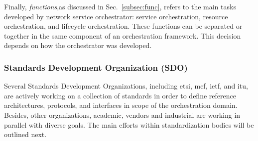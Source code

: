 Finally,  \textit{functions},as discussed in Sec.~\ref{subsec:func}, refers to the main tasks developed by network service orchestrator: service orchestration, resource orchestration, and lifecycle orchestration. These functions can be separated or together in the same component of an orchestration framework. This decision depends on how the orchestrator was developed.

\subsubsection{Standards Development Organization (SDO)}
Several Standards Development Organizations, including \gls{etsi}, \gls{mef}, \gls{ietf}, and \gls{itu}, are actively working on a collection of standards in order to define reference architectures, protocols, and interfaces in scope of the orchestration domain. Besides, other organizations, academic, vendors and industrial are working in parallel with diverse goals. The main efforts within standardization bodies will be outlined next.